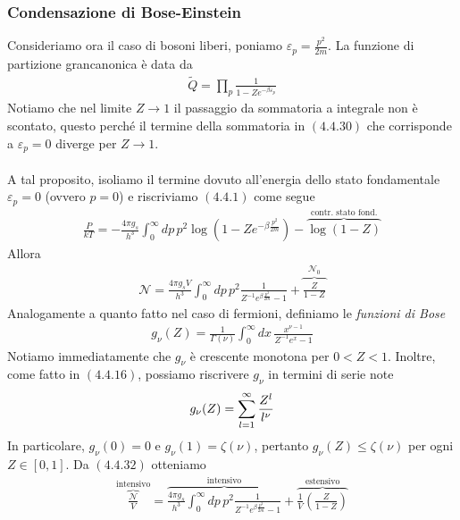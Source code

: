 \documentclass{article}
\begin{document}
\subsubsection*{Condensazione di Bose-Einstein}
Consideriamo ora il caso di bosoni liberi, poniamo $\varepsilon_p = \frac{p^2}{2m}$. La funzione di partizione grancanonica è data da
\begin{align}
    \tilde{Q} = \prod_p \frac{1}{1 - Ze^{-\beta\varepsilon_p}} \tag{4.4.30}
\end{align}
Notiamo che nel limite $Z \rightarrow 1$ il passaggio da sommatoria a integrale non è scontato, questo perché il termine della sommatoria in $(4.4.30)$ che corrisponde a $\varepsilon_p = 0$ diverge per $Z \rightarrow 1$. \\ \\
A tal proposito, isoliamo il termine dovuto all'energia dello stato fondamentale $\varepsilon_p = 0$ (ovvero $p = 0$) e riscriviamo $(4.4.1)$ come segue
\begin{align}
    \frac{P}{kT} = -\frac{4\pi g_s}{h^3}\int_0^\infty dp \, p^2\log(1 - Ze^{-\beta\frac{p^2}{2m}}) - \overbrace{\log(1 - Z)}^{\text{contr. stato fond.}}\tag{4.4.31}
\end{align}
Allora 
\begin{align}
    \mathcal{N} = \frac{4\pi g_sV}{h^3}\int_0^\infty dp \, p^2\frac{1}{Z^{-1}e^{\beta\frac{p^2}{2m}} - 1} + \overbrace{\frac{Z}{1 - Z}}^{\mathcal{N}_0} \tag{4.4.32}
\end{align}
Analogamente a quanto fatto nel caso di fermioni, definiamo le \textit{funzioni di Bose}
\begin{align}
    g_\nu(Z) = \frac{1}{\Gamma(\nu)}\int_0^\infty dx \, \frac{x^{\nu - 1}}{Z^{-1}e^x - 1} \tag{4.4.33}
\end{align}
Notiamo immediatamente che $g_\nu$ è crescente monotona per $0 < Z < 1$. Inoltre, come fatto in $(4.4.16)$, possiamo riscrivere $g_\nu$ in termini di serie note
\begin{align}
    g_\nu(Z) = \sum_{l = 1}^\infty \frac{Z^l}{l^\nu} \notag
\end{align}
In particolare, $g_\nu(0) = 0$ e $g_\nu(1) = \zeta(\nu)$, pertanto $g_\nu(Z) \leq \zeta(\nu)$ per ogni $Z \in [0, 1]$. Da $(4.4.32)$ otteniamo
\begin{align}
    \overbrace{\frac{\mathcal{N}}{V}}^{\text{intensivo}} = \overbrace{\frac{4\pi g_s}{h^3}\int_0^\infty dp \, p^2\frac{1}{Z^{-1}e^{\beta\frac{p^2}{2m}} - 1}}^{\text{intensivo}} + \overbrace{\frac{1}{V}\left(\frac{Z}{1 - Z}\right)}^{\text{estensivo}} \tag{4.4.34}
\end{align}
\end{document}
